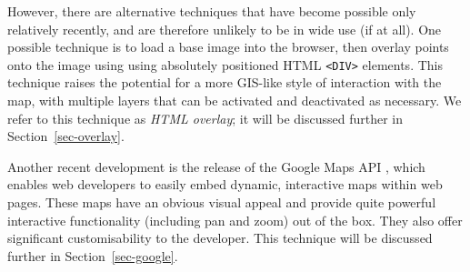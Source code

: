 \documentclass[acmtocl,acmnow]{acmtrans2m}
\begin{document}
However, there are alternative techniques that have become possible only
relatively recently, and are therefore unlikely to be in wide use (if at
all). One possible technique is to load a base image into the browser,
then overlay points onto the image using using absolutely positioned
HTML \verb|<DIV>| elements. This technique raises the potential for a
more GIS-like style of interaction with the map, with multiple layers
that can be activated and deactivated as necessary.  We refer to this
technique as \emph{HTML overlay}; it will be discussed further in
Section~\ref{sec-overlay}.

Another recent development is the release of the Google Maps API
\cite{Goog-M-2006-maps}, which enables web developers to easily embed
dynamic, interactive maps within web pages. These maps have an obvious
visual appeal and provide quite powerful interactive functionality
(including pan and zoom) out of the box. They also offer significant
customisability to the developer. This technique will be discussed
further in Section~\ref{sec-google}.

% 
% 
% 
% 

% 
% 	
% 	
% 
\end{document}
